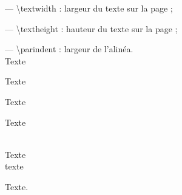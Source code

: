 \documentclass{article}
\begin{document}
— \textbackslash textwidth : largeur du texte sur la page ;

— \textbackslash textheight : hauteur du texte sur la page ;

— \textbackslash parindent : largeur de l’alinéa.\\

Texte

{Texte
\doublespacing%

Texte

Texte}\\

Texte\\texte\par Texte.
\end{document}
